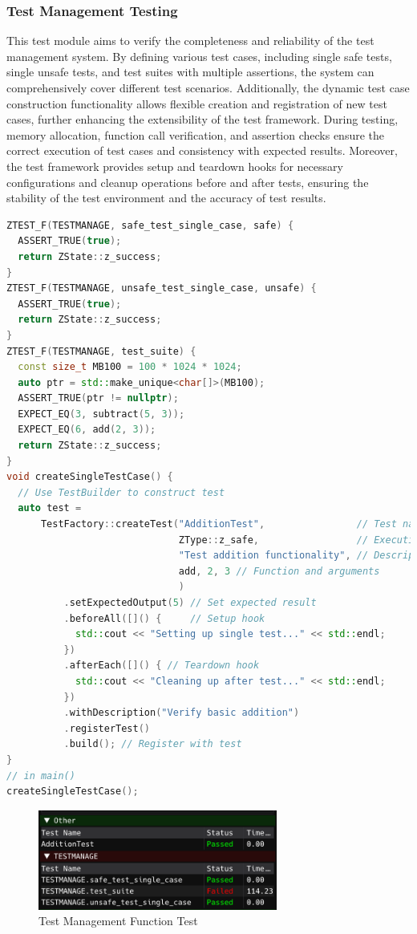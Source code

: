 \documentclass{article}
\begin{document}
\subsubsection{Test Management Testing}
This test module aims to verify the completeness and reliability of the test management system. By defining various test cases, including single safe tests, single unsafe tests, and test suites with multiple assertions, the system can comprehensively cover different test scenarios. Additionally, the dynamic test case construction functionality allows flexible creation and registration of new test cases, further enhancing the extensibility of the test framework. During testing, memory allocation, function call verification, and assertion checks ensure the correct execution of test cases and consistency with expected results. Moreover, the test framework provides setup and teardown hooks for necessary configurations and cleanup operations before and after tests, ensuring the stability of the test environment and the accuracy of test results.
\begin{framed}
    \begin{lstlisting}[language=C++]
ZTEST_F(TESTMANAGE, safe_test_single_case, safe) {
  ASSERT_TRUE(true);
  return ZState::z_success;
}
ZTEST_F(TESTMANAGE, unsafe_test_single_case, unsafe) {
  ASSERT_TRUE(true);
  return ZState::z_success;
}
ZTEST_F(TESTMANAGE, test_suite) {
  const size_t MB100 = 100 * 1024 * 1024;
  auto ptr = std::make_unique<char[]>(MB100);
  ASSERT_TRUE(ptr != nullptr);
  EXPECT_EQ(3, subtract(5, 3));
  EXPECT_EQ(6, add(2, 3));
  return ZState::z_success;
}
void createSingleTestCase() {
  // Use TestBuilder to construct test
  auto test =
      TestFactory::createTest("AdditionTest",                // Test name
                              ZType::z_safe,                 // Execution
                              "Test addition functionality", // Description
                              add, 2, 3 // Function and arguments
                              )
          .setExpectedOutput(5) // Set expected result
          .beforeAll([]() {     // Setup hook
            std::cout << "Setting up single test..." << std::endl;
          })
          .afterEach([]() { // Teardown hook
            std::cout << "Cleaning up after test..." << std::endl;
          })
          .withDescription("Verify basic addition")
          .registerTest()
          .build(); // Register with test
}
// in main()
createSingleTestCase();

\end{lstlisting}
\end{framed}
\begin{figure}[H]
    \centering
    \includegraphics[width=0.7\textwidth]{img/manage.png} %
    \caption{Test Management Function Test}
    \label{fig:test management function test}
\end{figure}
\newpage
\end{document}
